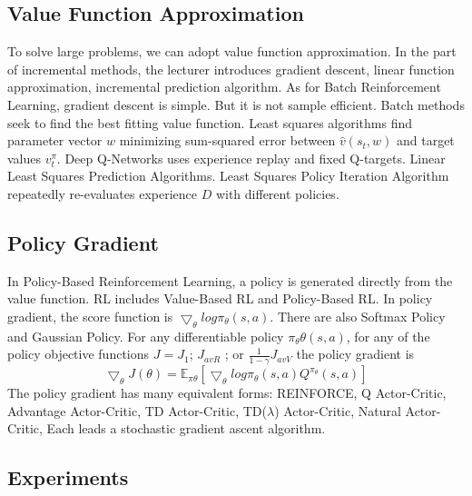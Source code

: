 \documentclass[10pt,twocolumn,letterpaper]{article}
\begin{document}
\subsection{Value Function Approximation}
To solve large problems, we can adopt value function approximation. In the part of incremental methods, the lecturer introduces gradient descent, linear function approximation, incremental prediction algorithm. As for Batch Reinforcement Learning, gradient descent is simple. But it is not sample efficient. Batch methods seek to find the best fitting value function. Least squares algorithms find parameter vector $w$ minimizing sum-squared error between $\hat{v}(s_t, w)$ and target values $v_t^\pi$. Deep Q-Networks uses experience replay and fixed Q-targets. Linear Least Squares Prediction Algorithms. Least Squares Policy Iteration Algorithm repeatedly re-evaluates experience $D$ with different policies.
%
\subsection{Policy Gradient}
In Policy-Based Reinforcement Learning, a policy is generated directly from the value function. RL includes Value-Based RL and Policy-Based RL. In policy gradient, the score function is $\bigtriangledown_\theta log\pi_\theta(s,a)$. There are also Softmax Policy and Gaussian Policy. For any differentiable policy $\pi_\theta\theta(s, a)$, for any of the policy objective functions $J = J_1$; $J_{avR}$ ; or $\frac{1}{1-\gamma}$$J_{avV}$
the policy gradient is$$\bigtriangledown_\theta J(\theta)=\mathbb{E}_{\pi \theta}[\bigtriangledown_\theta log \pi_\theta(s, a)Q^{\pi_\theta}(s, a)]$$
The policy gradient has many equivalent forms: REINFORCE, Q Actor-Critic, Advantage Actor-Critic, TD Actor-Critic, TD($\lambda$) Actor-Critic, Natural Actor-Critic, Each leads a stochastic gradient ascent algorithm.
\subsection{Experiments}
\end{document}
